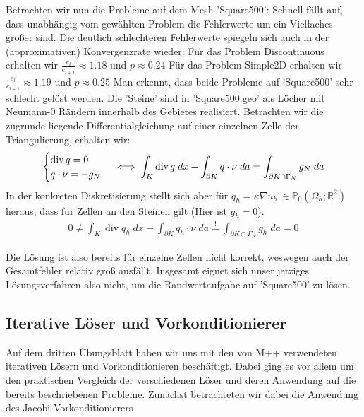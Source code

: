 \documentclass[12pt,a4paper]{scrartcl}
\newcommand{\R}{\mathbb{R}}
\DeclareMathOperator{\dive}{div}
\numberwithin{equation}{section}
\begin{document}
\begin{enumerate}[label=(\roman*)]
Betrachten wir nun die Probleme auf dem Mesh 'Square500': Schnell fällt auf, dass unabhängig vom gewählten Problem die Fehlerwerte um ein Vielfaches größer sind. Die deutlich schlechteren Fehlerwerte spiegeln sich auch in der (approximativen) Konvergenzrate wieder: \newline
Für das Problem Discontinuous erhalten wir $ \frac{e_l}{e_{l+1}} \approx 1.18 $ und $p \approx 0.24$ \newline
Für das Problem Simple2D erhalten wir $ \frac{e_l}{e_{l+1}} \approx 1.19 $ und $p \approx 0.25$ \newline
Man erkennt, dass beide Probleme auf 'Square500' sehr schlecht gelöst werden.
Die 'Steine' sind in 'Square500.geo' als Löcher mit Neumann-0 Rändern innerhalb des Gebietes realisiert. 
Betrachten wir die zugrunde liegende Differentialgleichung auf einer einzelnen Zelle der Triangulierung, erhalten wir:
\begin{align*}
	\begin{cases}
		\dive q = 0 \\
			q \cdot \nu = -g_N 
	\end{cases}
	\iff \int_K{ \dive q \; dx} - \int_{ \partial K}{q\cdot \nu \; da} = \int_{ \partial K \cap \Gamma_N} {g_N \; da } 
\newline	
\end{align*}
In der konkreten Diskretisierung stellt sich aber für $q_h = \kappa \nabla u_h \ \in \mathbb{P}_0( \Omega_h ; \R^2) $ heraus, dass für Zellen an den Steinen gilt (Hier ist $g_h = 0$): 
\begin{align*}	
	 0 \neq \int_K{ \dive q_h \; dx} - \int_{ \partial K}{q_h \cdot \nu \; da} \stackrel{!}{=} \int_{ \partial K \cap \Gamma_N} {g_h \; da } = 0 
\end{align*}

Die Lösung ist also bereits für einzelne Zellen nicht korrekt, weswegen auch der Gesamtfehler relativ groß ausfällt. Insgesamt eignet sich unser jetziges Lösungsverfahren also nicht, um die Randwertaufgabe auf 'Square500' zu lösen.




\end{enumerate}

\subsection{Iterative Löser und Vorkonditionierer}

Auf dem dritten Übungsblatt haben wir uns mit den von M++ verwendeten iterativen Lösern und Vorkonditionieren beschäftigt.
Dabei ging es vor allem um den praktischen Vergleich der verschiedenen Löser und deren Anwendung auf die bereits beschriebenen Probleme.
Zunächst betrachteten wir dabei die Anwendung des Jacobi-Vorkonditionierers 
\end{document}
